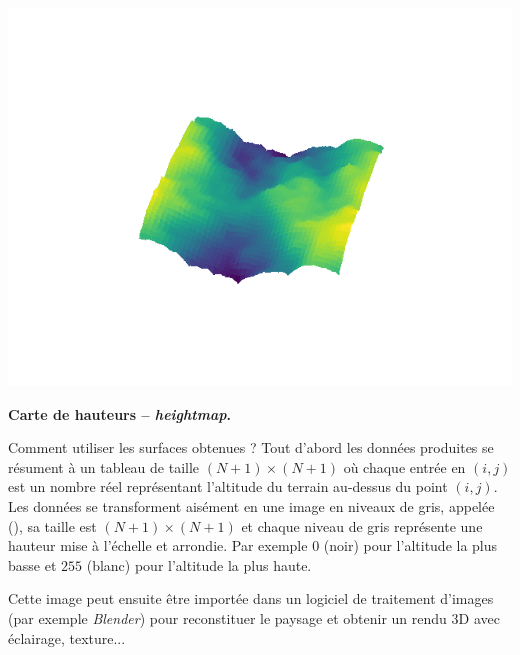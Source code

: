 \documentclass[11pt,class=report,crop=false]{standalone}
\begin{document}
\begin{exemple}
\begin{center}
\includegraphics[scale=\myscale,scale=0.3]{figures/diamant-carre-02-3}

\end{center}

\end{exemple}

\textbf{Carte de hauteurs -- \emph{heightmap}.}

Comment utiliser les surfaces obtenues ? 
Tout d'abord les données produites se résument à un tableau de taille $(N+1)\times(N+1)$ où chaque entrée en $(i,j)$ est un nombre réel représentant l'altitude du terrain au-dessus du point $(i,j)$.
Les données se transforment aisément en une image en niveaux de gris, appelée  (), sa taille est $(N+1)\times(N+1)$ et chaque niveau de gris représente une hauteur mise à l'échelle et arrondie. Par exemple $0$ (noir) pour l'altitude la plus basse et $255$ (blanc) pour l'altitude la plus haute.

Cette image peut ensuite être importée dans un logiciel de traitement d'images (par exemple \textsl{Blender}) pour reconstituer le paysage et obtenir un rendu 3D avec éclairage, texture...
\end{document}
